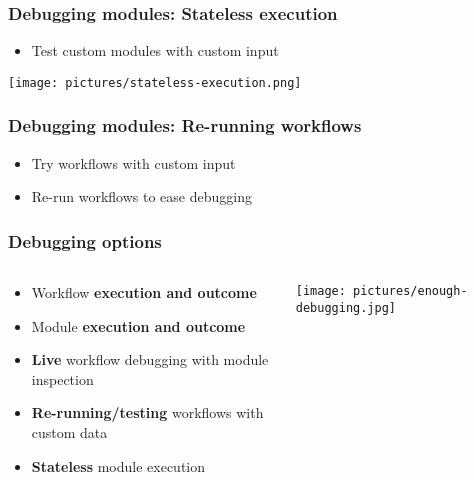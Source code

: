 \begin{frame}
    \frametitle{Debugging modules: Stateless execution}
    \begin{itemize}
        \item Test custom modules with custom input
    \end{itemize}
    \begin{center}
        \texttt{[image: pictures/stateless-execution.png]}
    \end{center}
\end{frame}

\begin{frame}
    \frametitle{Debugging modules: Re-running workflows}
    \begin{itemize}
        \item Try workflows with custom input
        \item Re-run workflows to ease debugging
    \end{itemize}
    \begin{center}
    \end{center}
\end{frame}

\begin{frame}
    \frametitle{Debugging options}
    \begin{columns}
        \begin{column}{0.6\textwidth}
            \begin{itemize}
                \item Workflow \textbf{execution and outcome}
                \item Module \textbf{execution and outcome}
                \item \textbf{Live} workflow debugging with module inspection
                \item \textbf{Re-running/testing} workflows with custom data
                \item \textbf{Stateless} module execution
            \end{itemize}
        \end{column}
        \begin{column}{0.4\textwidth}
            \texttt{[image: pictures/enough-debugging.jpg]}
        \end{column}
    \end{columns}
\end{frame}

